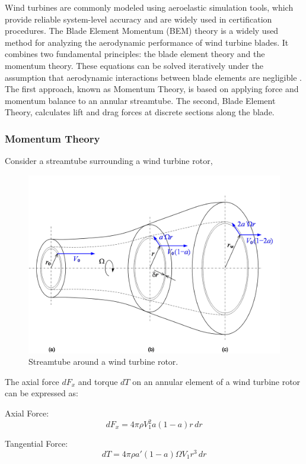Wind turbines are commonly modeled using aeroelastic simulation tools, which provide reliable system-level accuracy and are widely used in certification procedures. The Blade Element Momentum (BEM) theory is a widely used method for analyzing the aerodynamic performance of wind turbine blades. It combines two fundamental principles: the blade element theory and the momentum theory. These equations can be solved iteratively under the assumption that aerodynamic interactions between blade elements are negligible \cite{ingram2011blade}. The first approach, known as Momentum Theory, is based on applying force and momentum balance to an annular streamtube. The second, Blade Element Theory, calculates lift and drag forces at discrete sections along the blade.
\subsubsection{Momentum Theory}
Consider a streamtube surrounding a wind turbine rotor,
\begin{figure}[ht]
    \centering
    \includegraphics[width=\textwidth]{Figures/aerodynamics_streamtube.png}
    \caption{Streamtube around a wind turbine rotor.}
    \label{fig:streamtube}
\end{figure}


The axial force $dF_x$ and torque $dT$ on an annular element of a wind turbine rotor can be expressed as:

Axial Force:
\begin{equation}
dF_x = 4\pi \rho V_1^2 a(1 - a) r \, dr
\end{equation}

Tangential Force:
\begin{equation}
dT = 4\pi \rho a' (1 - a) \Omega V_1 r^3 \, dr
\end{equation}

